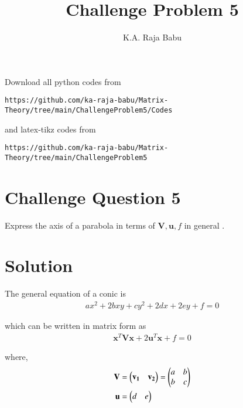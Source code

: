 \documentclass[journal,12pt,twocolumn]{IEEEtran}
\begin{document}
\makeatother
\let\StandardTheFigure\thefigure
\let\vec\mathbf
\renewcommand{\thefigure}{\theproblem}
\def\putbox#1#2#3{\makebox[0in][l]{\makebox[#1][l]{}\raisebox{\baselineskip}[0in][0in]{\raisebox{#2}[0in][0in]{#3}}}}
     \def\rightbox#1{\makebox[0in][r]{#1}}
     \def\centbox#1{\makebox[0in]{#1}}
     \def\topbox#1{\raisebox{-\baselineskip}[0in][0in]{#1}}
     \def\midbox#1{\raisebox{-0.5\baselineskip}[0in][0in]{#1}}
\vspace{3cm}
\title{Challenge Problem 5}
\author{K.A. Raja Babu}
\maketitle
\newpage
\bigskip
\renewcommand{\thefigure}{\theenumi}
\renewcommand{\thetable}{\theenumi}
Download all python codes from 
\begin{lstlisting}
https://github.com/ka-raja-babu/Matrix-Theory/tree/main/ChallengeProblem5/Codes
\end{lstlisting}
%
and latex-tikz codes from 
%
\begin{lstlisting}
https://github.com/ka-raja-babu/Matrix-Theory/tree/main/ChallengeProblem5
\end{lstlisting}
%
\section{Challenge Question 5}

Express the axis of a parabola in terms of $\vec{V},\vec{u},f$ in general .

\section{Solution}

The general equation of a conic is
\begin{align}
  ax^2+2bxy+cy^2+2dx+2ey+f=0
\end{align}

which can be written in matrix form as
\begin{align}
    \vec{x}^T\vec{V}\vec{x} + 2\vec{u}^T\vec{x} + f =0
\end{align}

where,
\begin{align}
    \vec{V} &= \myvec{\vec{v_1} & \vec{v_2}}=\myvec{a & b \\ b& c}
    \\
    \vec{u} &= \myvec{d & e}
\end{align}
\end{document}
